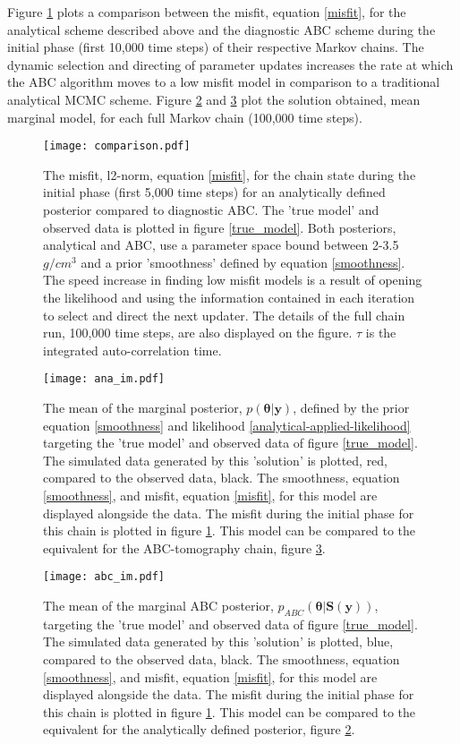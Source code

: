 Figure \ref{comparison-1} plots a comparison between the misfit, equation \ref{misfit}, for the analytical scheme described above and the diagnostic ABC scheme during the initial phase (first 10,000 time steps) of their respective Markov chains. The dynamic selection and directing of parameter updates increases the rate at which the ABC algorithm moves to a low misfit model in comparison to a traditional analytical MCMC scheme. Figure \ref{ana-im-1} and \ref{abc-im-1} plot the solution obtained, mean marginal model, for each full Markov chain (100,000 time steps).\par

\begin{figure}[H]
	\centering
	\texttt{[image: comparison.pdf]}
	\caption{The misfit, l2-norm, equation \ref{misfit}, for the chain state during the initial phase (first 5,000 time steps) for an analytically defined posterior compared to diagnostic ABC. The 'true model' and observed data is plotted in figure \ref{true_model}. Both posteriors, analytical and ABC, use a parameter space bound between 2-3.5 $g/cm^3$ and a prior 'smoothness' defined by equation \ref{smoothness}. The speed increase in finding low misfit models is a result of opening the likelihood and using the information contained in each iteration to select and direct the next updater. The details of the full chain run, 100,000 time steps, are also displayed on the figure. $\tau$ is the integrated auto-correlation time.}
	\label{comparison-1}
\end{figure}

\begin{figure}[H]
	\centering
	\texttt{[image: ana\_im.pdf]}
	\caption{The mean of the marginal posterior, $p(\bm{\theta}|\bm{y})$, defined by the prior equation \ref{smoothness} and likelihood \ref{analytical-applied-likelihood} targeting the 'true model' and observed data of figure \ref{true_model}. The simulated data generated by this 'solution' is plotted, red, compared to the observed data, black. The smoothness, equation \ref{smoothness}, and misfit, equation \ref{misfit}, for this model are displayed alongside the data. The misfit during the initial phase for this chain is plotted in figure \ref{comparison-1}. This model can be compared to the equivalent for the ABC-tomography chain, figure \ref{abc-im-1}.}
	\label{ana-im-1}
\end{figure}

\begin{figure}[H]
	\centering
	\texttt{[image: abc\_im.pdf]}
	\caption{The mean of the marginal ABC posterior, $p_{ABC}(\bm{\theta}|\bm{S}(\bm{y}))$, targeting the 'true model' and observed data of figure \ref{true_model}. The simulated data generated by this 'solution' is plotted, blue, compared to the observed data, black. The smoothness, equation \ref{smoothness}, and misfit, equation \ref{misfit}, for this model are displayed alongside the data. The misfit during the initial phase for this chain is plotted in figure \ref{comparison-1}. This model can be compared to the equivalent for the analytically defined posterior, figure \ref{ana-im-1}.}
	\label{abc-im-1}
\end{figure}



